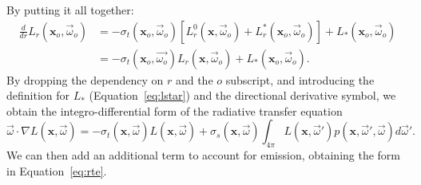 By putting it all together:
\begin{equation*}
\begin{split}
\frac{d}{dr} L_r(\mathbf{x}_o, \vec{\omega}_o) &= -\sigma_t(\mathbf{x}_o, \vec{\omega}_o) [L^0_r(\mathbf{x}, \vec{\omega}_o) + L^*_r(\mathbf{x}_o, \vec{\omega}_o)] + L_*(\mathbf{x}_o, \vec{\omega}_o) \\
&=  -\sigma_t(\mathbf{x}_o, \vec{\omega_o}) L_r(\mathbf{x}, \vec{\omega}_o) +  L_*(\mathbf{x}_o, \vec{\omega}_o) .
\end{split}
\end{equation*}
By dropping the dependency on $r$ and the $o$ subscript, and introducing the definition for $L_*$ (Equation~\ref{eq:lstar}) and the directional derivative symbol, we obtain the integro-differential form of the radiative  transfer equation
\begin{equation*}\vec{\omega} \cdot \nabla L(\mathbf{x}, \vec{\omega}) = - \sigma_t(\mathbf{x}, \vec{\omega}) L(\mathbf{x}, \vec{\omega}) + \sigma_s(\mathbf{x}, \vec{\omega}) \int_{4\pi} L(\mathbf{x}, \vec{\omega}')  p(\mathbf{x}, \vec{\omega}', \vec{\omega}) d \vec{\omega}'.
\end{equation*}
We can then add an additional term to account for emission, obtaining the form in Equation~\ref{eq:rte}.
